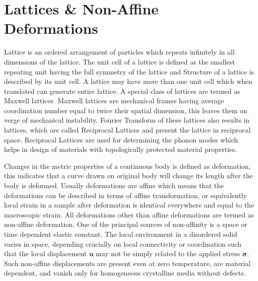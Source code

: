\section{Lattices \& Non-Affine Deformations}
Lattice is an ordered arrangement of particles which repeats infinitely in all dimensions of the lattice. The unit cell of a lattice is defined as the smallest repeating unit having the full symmetry of the lattice and Structure of a lattice is described by its unit cell. A lattice may have more than one unit cell which when translated can generate entire lattice. A special class of lattices are termed as Maxwell lattices. Maxwell lattices are mechanical frames having average coordination number equal to twice their spatial dimension, this leaves them on verge of mechanical instability. Fourier Transform of these lattices also results in lattices, which are called Reciprocal Lattices and present the lattice in reciprocal space. Reciprocal Lattices are used for determining the phonon modes which helps in design of materials with topologically protected material properties.


Changes in the metric properties of a continuous body is defined as deformation, this indicates that a curve drawn on original body will change its length after the body is deformed. Usually deformations are affine which means that the deformations can be described in terms of affine transformation, or equivalently local strain in a sample after deformation is identical everywhere and equal to the macroscopic strain. All deformations other than affine deformations are termed as non-affine deformation. One of the principal sources of non-affinity is a space or time dependent elastic constant. The local environment in a disordered solid varies in space, depending crucially on local connectivity or coordination such that the local displacement $\textbf{u}$ may not be simply related to the applied stress $\boldsymbol{\sigma}$. Such non-affine displacements are present even at zero temperature, are material dependent, and vanish only for homogeneous crystalline media without defects\cite{Gang}.

